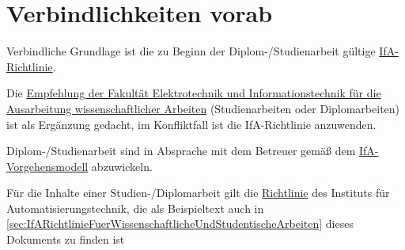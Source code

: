 
\chapter{Verbindlichkeiten vorab}
\label{sec:VerbindlichkeitenVorab}

\begin{compactitem}
  \item Verbindliche Grundlage ist die zu Beginn der Diplom-/Studienarbeit gültige \href{http://www.et.tu-dresden.de/ifa/index.php?id=330}{IfA-Richtlinie}.
  \item Die \href{http://www.et.tu-dresden.de/etit/uploads/media/EmpfehlungWissenschArbeiten2013_05.pdf}{Empfehlung der Fakultät Elektrotechnik und Informationstechnik für die Ausarbeitung wissenschaftlicher Arbeiten} (Studienarbeiten oder Diplomarbeiten) ist als Ergänzung gedacht, im Konfliktfall ist die IfA-Richtlinie anzuwenden.
  \item Diplom-/Studienarbeit sind in Absprache mit dem Betreuer gemäß dem \href{http://www.et.tu-dresden.de/ifa/index.php?id=331&L=1?keepThis=true}{IfA-Vorgehensmodell} abzuwickeln.
  \item Für die Inhalte einer Studien-/Diplomarbeit gilt die \href{http://www.et.tu-dresden.de/ifa/index.php?id=336&L=1?keepThis=true}{Richtlinie} des Instituts für Automatisierungstechnik, die als Beispieltext auch in \autoref{sec:IfARichtlinieFuerWissenschaftlicheUndStudentischeArbeiten} dieses Dokuments zu finden ist
\end{compactitem}